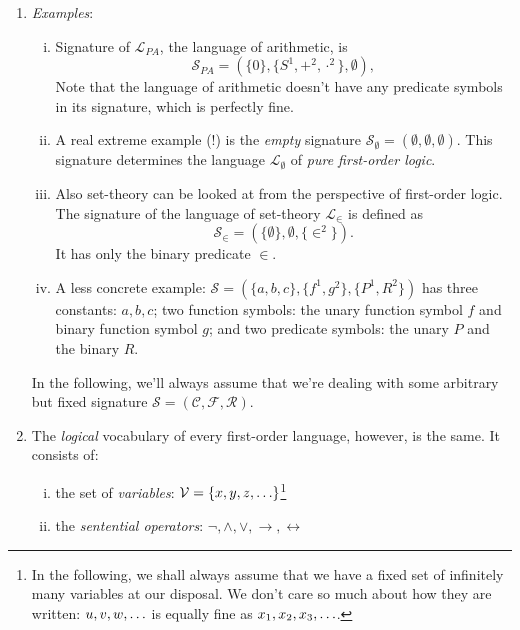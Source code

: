 \begin{enumerate}[\thesection.1]
		\item \emph{Examples}:
		
			\begin{enumerate}[(i)]
			
				\item Signature of $\mathcal{L}_{PA}$, the language of arithmetic, is \[\mathcal{S}_{PA}=(\{0\}, \{S^1, +^2, \cdot^2\}, \emptyset),\] Note that the language of arithmetic doesn't have any predicate symbols in its signature, which is perfectly fine.
				
				\item A real extreme example (!) is the \emph{empty} signature $\mathcal{S}_\emptyset=(\emptyset,\emptyset,\emptyset).$ This signature determines the language $\mathcal{L}_\emptyset$ of \emph{pure first-order logic}.
				
				\item Also set-theory can be looked at from the perspective of first-order logic. The signature of the language of set-theory $\mathcal{L}_\in$ is defined as \[\mathcal{S}_\in=(\{\emptyset\}, \emptyset, \{\in^2\}).\] It has only the binary predicate $\in$.
			
			
				\item A less concrete example: $\mathcal{S}=(\{a,b,c\}, \{f^1, g^2\}, \{P^1, R^2\})$ has three constants: $a,b,c$; two function symbols: the unary function symbol $f$ and binary function symbol $g$; and two predicate symbols: the unary $P$ and the binary $R$.
			
			\end{enumerate}
		
		In the following, we'll always assume that we're dealing with some arbitrary but fixed signature $\mathcal{S}=(\mathcal{C}, \mathcal{F}, \mathcal{R})$.
	
		\item The \emph{logical} vocabulary of every first-order language, however, is the same. It consists of:
		\begin{enumerate}[(i)]
		
			\item the set of \emph{variables}: $\mathcal{V}=\{x,y,z,\mathellipsis\}$\footnote{In the following, we shall always assume that we have a fixed set of infinitely many variables at our disposal. We don't care so much about how they are written: $u,v,w,\mathellipsis$ is equally fine as $x_1, x_2, x_3,\mathellipsis$.}
			
			\item the \emph{sentential operators}: $\neg,\land,\lor,\to,\leftrightarrow$
			

\end{enumerate}
\end{enumerate}

